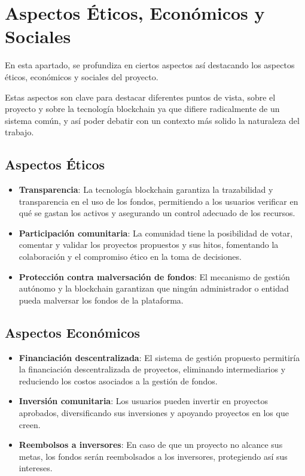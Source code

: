 \section{Aspectos Éticos, Económicos y Sociales}

En esta apartado, se profundiza en ciertos aspectos así destacando los aspectos éticos, económicos y sociales del proyecto.

\bigskip

Estas aspectos son clave para destacar diferentes puntos de vista, sobre el proyecto y sobre la tecnología blockchain ya que difiere radicalmente de un sistema común, y así poder debatir con un contexto más solido la naturaleza del trabajo.

\subsection{Aspectos Éticos}

\begin{itemize}
    \item \textbf{Transparencia}: La tecnología blockchain garantiza la trazabilidad y transparencia en el uso de los fondos, permitiendo a los usuarios verificar en qué se gastan los activos y asegurando un control adecuado de los recursos.
    
    \item \textbf{Participación comunitaria}: La comunidad tiene la posibilidad de votar, comentar y validar los proyectos propuestos y sus hitos, fomentando la colaboración y el compromiso ético en la toma de decisiones.
    
    \item \textbf{Protección contra malversación de fondos}: El mecanismo de gestión autónomo y la blockchain garantizan que ningún administrador o entidad pueda malversar los fondos de la plataforma.
\end{itemize}

\subsection{Aspectos Económicos}

\begin{itemize}
    \item \textbf{Financiación descentralizada}: El sistema de gestión propuesto permitiría la financiación descentralizada de proyectos, eliminando intermediarios y reduciendo los costos asociados a la gestión de fondos.
    
    \item \textbf{Inversión comunitaria}: Los usuarios pueden invertir en proyectos aprobados, diversificando sus inversiones y apoyando proyectos en los que creen.
    
    \item \textbf{Reembolsos a inversores}: En caso de que un proyecto no alcance sus metas, los fondos serán reembolsados a los inversores, protegiendo así sus intereses.
\end{itemize}


